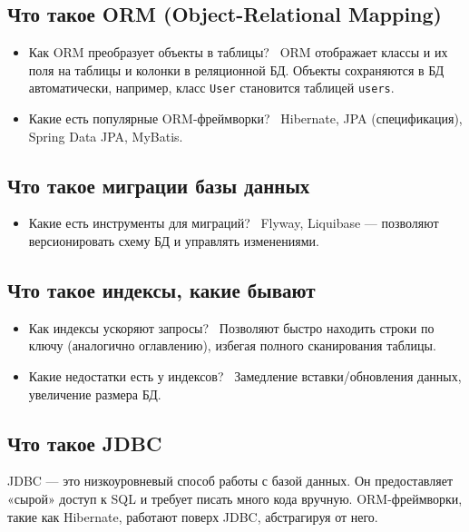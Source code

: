 \documentclass[a4paper,14pt]{article}
\begin{document}
\subsection{Что такое ORM (Object-Relational Mapping)}

\begin{itemize}
\item Как ORM преобразует объекты в таблицы? \
ORM отображает классы и их поля на таблицы и колонки в реляционной БД. Объекты сохраняются в БД автоматически, например, класс \texttt{User} становится таблицей \texttt{users}.

\item Какие есть популярные ORM-фреймворки? \
Hibernate, JPA (спецификация), Spring Data JPA, MyBatis.
\end{itemize}

\subsection{Что такое миграции базы данных}

\begin{itemize}
\item Какие есть инструменты для миграций? \
Flyway, Liquibase — позволяют версионировать схему БД и управлять изменениями.

\end{itemize}

\subsection{Что такое индексы, какие бывают}

\begin{itemize}
\item Как индексы ускоряют запросы? \
Позволяют быстро находить строки по ключу (аналогично оглавлению), избегая полного сканирования таблицы.

\item Какие недостатки есть у индексов? \
Замедление вставки/обновления данных, увеличение размера БД.
\end{itemize}

\subsection{Что такое JDBC}

JDBC — это низкоуровневый способ работы с базой данных. Он предоставляет «сырой» доступ к SQL и требует писать много кода вручную. ORM-фреймворки, такие как Hibernate, работают поверх JDBC, абстрагируя от него.
\end{document}
